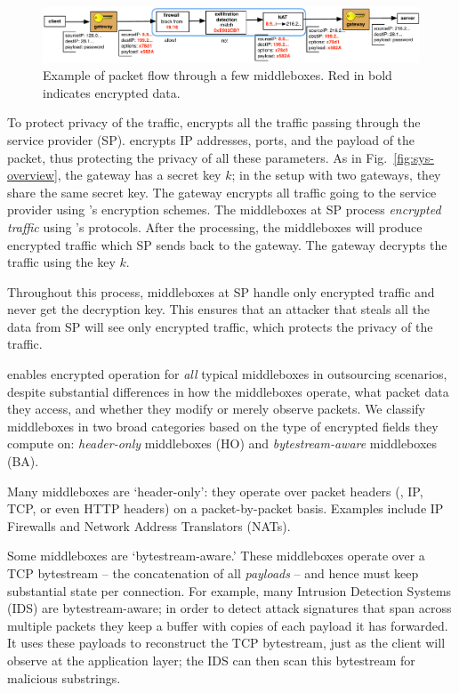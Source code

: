 \begin{figure}[t!]
\centering
  \includegraphics[width=6.7in]{fig/packetpath.pdf}
\caption{Example of packet flow through a few middleboxes. Red in bold indicates encrypted data. \label{fig:packetflow}}
\end{figure}



To protect privacy of the traffic, \sys encrypts all the traffic passing through the service provider (SP).
\sys encrypts IP addresses, ports, and the payload of the packet, thus protecting the privacy of all these parameters. 
As in Fig.~\ref{fig:sys-overview}, the gateway has a secret key $k$; in the setup with two gateways, they share
the same secret key. The gateway encrypts all traffic going to the service provider using \sys's encryption schemes.
The middleboxes at SP process {\em encrypted traffic} using \sys's protocols. 
After the processing, the middleboxes
will produce encrypted traffic which SP sends back to the gateway. The gateway decrypts the traffic using the key $k$.

Throughout this process, middleboxes at SP handle only encrypted traffic and never get the decryption key. This ensures
that an attacker that steals all the data from SP will  see only encrypted traffic, which protects the privacy of the 
traffic. 



 \sys enables encrypted operation for {\em all} typical middleboxes in outsourcing scenarios, despite substantial differences in how the middleboxes operate, what packet data they access, and whether they modify or merely observe packets.
  We classify middleboxes in  two broad categories based on the type of encrypted fields  they compute on: {\em header-only} middleboxes (HO) and {\em bytestream-aware} middleboxes (BA).
 
Many middleboxes are `header-only': they operate over packet headers (\eg{}, IP, TCP, or even HTTP headers) on a packet-by-packet basis.
Examples  include IP Firewalls and Network Address Translators (NATs). 

Some middleboxes are `bytestream-aware.' These middleboxes operate over a TCP bytestream -- the concatenation of all {\it payloads} -- and hence must keep substantial state per connection.
  For example, many Intrusion Detection Systems (IDS) are bytestream-aware; in order to detect attack signatures that span across multiple packets they keep a buffer  with copies of each payload it has forwarded.
  It uses these payloads to reconstruct the TCP bytestream, just as the client will observe at the application layer; the IDS can then scan this bytestream for malicious substrings.
   
